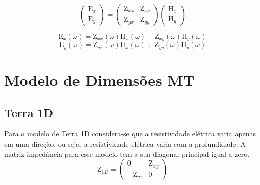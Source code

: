	    \begin{equation}
		\left (\begin{array}{c}
		 \textrm{E}_x\\
		 \textrm{E}_y
		\end{array}\right)
		=
		\left (\begin{array}{cc}
		 \textrm{Z}_{xx} & \textrm{Z}_{xy}\\
		 \textrm{Z}_{yx} & \textrm{Z}_{yy}
		\end{array}\right) \left (\begin{array}{c}
		 \textrm{H}_x\\
		 \textrm{H}_y
		\end{array}\right)
	    \end{equation}
	    
	    \begin{equation}
	    \label{Ex_Z}
	     \textrm{E}_x (\omega)=\textrm{Z}_{xx}(\omega) \textrm{H}_{x}(\omega) + \textrm{Z}_{xy}(\omega) \textrm{H}_{y}(\omega)
	    \end{equation}
	    \begin{equation}
	    \label{Ey_Z}
	     \textrm{E}_y (\omega)=\textrm{Z}_{yx}(\omega) \textrm{H}_{x}(\omega) + \textrm{Z}_{yy}(\omega) \textrm{H}_{y}(\omega)
	    \end{equation}  
    
    
    \section{Modelo de Dimensões MT}
    
        
        \subsection{Terra 1D}
        
        Para o modelo de Terra 1D considera-se que a resistividade elétrica varia apenas em uma direção, ou seja, a resistividade elétrica varia com a profundidade.        
        A matriz impedância para esse modelo tem a sua diagonal principal igual a zero.
        \begin{equation}
         \textrm{Z}_{1 D} = \left ( \begin{array}{cc}
                                     0 & \textrm{Z}_{xy} \\
                                    -\textrm{Z}_{yx} & 0
                                     \end{array}  \right)
        \end{equation}
        
